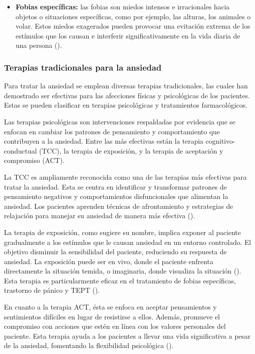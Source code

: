 \begin{itemize}
	\item \textbf{Fobias específicas:} las fobias son miedos intensos e irracionales hacia objetos o situaciones específicas, como por ejemplo, las alturas, los animales o volar. Estos miedos exagerados pueden provocar una evitación extrema de los estímulos que los causan e interferir significativamente en la vida diaria de una persona (\cite{APA:2013}).
\end{itemize}

\subsubsection{Terapias tradicionales para la ansiedad}

Para tratar la ansiedad se emplean diversas terapias tradicionales, las cuales han demostrado ser efectivas para las afecciones físicas y psicológicas de los pacientes. Estas se pueden clasificar en terapias psicológicas y tratamientos farmacológicos. 

Las terapias psicológicas son intervenciones respaldadas por evidencia que se enfocan en cambiar los patrones de pensamiento y comportamiento que contribuyen a la ansiedad. Entre las más efectivas están la terapia cognitivo-conductual (TCC), la terapia de exposición, y la terapia de aceptación y compromiso (ACT).

La TCC es ampliamente reconocida como una de las terapias más efectivas para tratar la ansiedad. Esta se centra en identificar y transformar patrones de pensamiento negativos y comportamientos disfuncionales que alimentan la ansiedad. Los pacientes aprenden técnicas de afrontamiento y estrategias de relajación para manejar su ansiedad de manera más efectiva (\cite{HOFMANN:2012}).

La terapia de exposición, como sugiere su nombre, implica exponer al paciente gradualmente a los estímulos que le causan ansiedad en un entorno controlado. El objetivo disminuir la sensibilidad del paciente, reduciendo su respuesta de ansiedad. La exposición puede ser en vivo, donde el paciente enfrenta directamente la situación temida, o imaginaria, donde visualiza la situación (\cite{CRASKE:2008}). Esta terapia es particularmente eficaz en el tratamiento de fobias específicas, trastorno de pánico y TEPT (\cite{POWERS:2010}).

En cuanto a la terapia ACT, ésta se enfoca en aceptar pensamientos y sentimientos difíciles en lugar de resistirse a ellos. Además, promueve el compromiso con acciones que estén en línea con los valores personales del paciente. Esta terapia ayuda a los pacientes a llevar una vida significativa a pesar de la ansiedad, fomentando la flexibilidad psicológica (\cite{HAYES:2012}).

